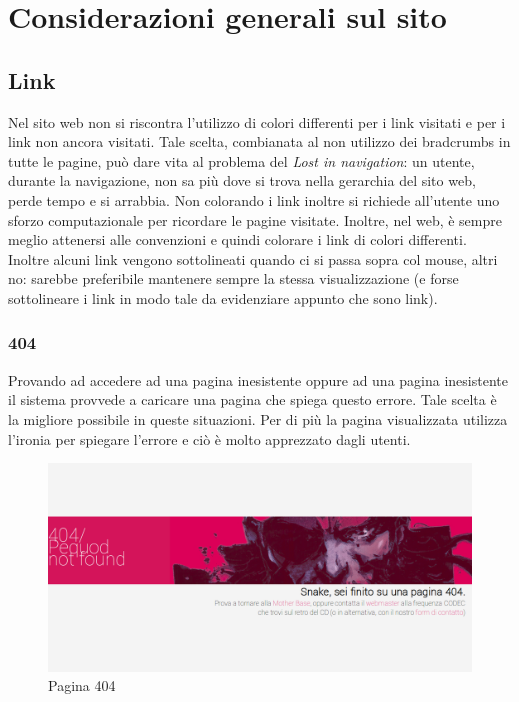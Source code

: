 \documentclass[../ProgettoTecWeb2.tex]{subfiles}
\begin{document}
\section{Considerazioni generali sul sito}
	
	\subsection{Link}
	Nel sito web non si riscontra l'utilizzo di colori differenti per i link visitati e per i link non ancora visitati. Tale scelta, combianata al non utilizzo dei bradcrumbs in tutte le pagine, può dare vita al problema del \textit{Lost in navigation}: un utente, durante la navigazione, non sa più dove si trova nella gerarchia del sito web, perde tempo e si arrabbia. Non colorando i link inoltre si richiede all'utente uno sforzo computazionale per ricordare le pagine visitate. Inoltre, nel web, è sempre meglio attenersi alle convenzioni e quindi colorare i link di colori differenti. Inoltre alcuni link vengono sottolineati quando ci si passa sopra col mouse, altri no: sarebbe preferibile mantenere sempre la stessa visualizzazione (e forse sottolineare i link in modo tale da evidenziare appunto che sono link).

		\subsubsection{404}
		Provando ad accedere ad una pagina inesistente oppure ad una pagina inesistente il sistema provvede a caricare una pagina che spiega questo errore. Tale scelta è la migliore possibile in queste situazioni. Per di più la pagina visualizzata utilizza l'ironia per spiegare l'errore e ciò è molto apprezzato dagli utenti.
		\begin{figure} [H]
			\centering
			\includegraphics[scale=0.3]{img/404}
			\caption{Pagina 404}
		\end{figure}
\end{document}

